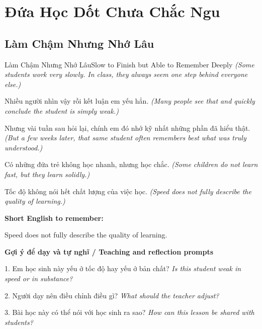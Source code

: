 \chapter{Đứa Học Dốt Chưa Chắc Ngu}

\section{Làm Chậm Nhưng Nhớ Lâu}
\begin{truyen}{Làm Chậm Nhưng Nhớ Lâu}{Slow to Finish but Able to Remember Deeply}
\textit{(Some students work very slowly. In class, they always seem one step behind everyone else.)}

Nhiều người nhìn vậy rồi kết luận em yếu hẳn.
\textit{(Many people see that and quickly conclude the student is simply weak.)}

Nhưng vài tuần sau hỏi lại, chính em đó nhớ kỹ nhất những phần đã hiểu thật.
\textit{(But a few weeks later, that same student often remembers best what was truly understood.)}

Có những đứa trẻ không học nhanh, nhưng học chắc.
\textit{(Some children do not learn fast, but they learn solidly.)}

\end{truyen}

\begin{baihoc}
Tốc độ không nói hết chất lượng của việc học.
\textit{(Speed does not fully describe the quality of learning.)}
\end{baihoc}

\begin{ghinhoanh}
\textbf{Short English to remember:}

Speed does not fully describe the quality of learning.

\end{ghinhoanh}

\begin{tuhocnhanh}
\textbf{Gợi ý để dạy và tự nghĩ / Teaching and reflection prompts}

1. Em học sinh này yếu ở tốc độ hay yếu ở bản chất? \textit{Is this student weak in speed or in substance?}

2. Người dạy nên điều chỉnh điều gì? \textit{What should the teacher adjust?}

3. Bài học này có thể nói với học sinh ra sao? \textit{How can this lesson be shared with students?}
\end{tuhocnhanh}
\ngancach


